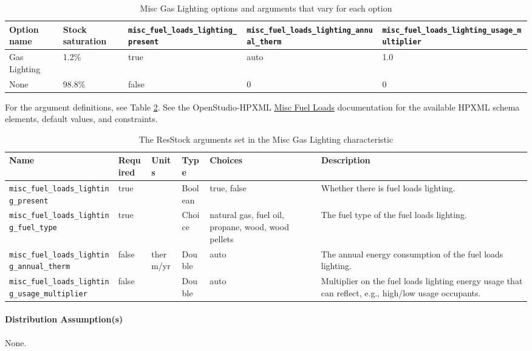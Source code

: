 \begin{longtable}[]{|p{}|p{1.5cm}|p{3.5cm}|p{3.5cm}|p{3.5cm}|} \caption{Misc Gas Lighting options and arguments that vary for each option} \label{table:hc_opt_def_misc_gas_light} \\

\toprule\noalign{}
Option name & Stock saturation &
\texttt{misc\_fuel\_loads\_lighting\_present} &
\texttt{misc\_fuel\_loads\_lighting\_annual\_therm} &
\texttt{misc\_fuel\_loads\_lighting\_usage\_multiplier} \\
\midrule\noalign{}
\endhead
\bottomrule\noalign{}
\endlastfoot
Gas Lighting & 1.2\% & true &  auto & 1.0 \\
None & 98.8\% & false &  0 & 0 \\
\end{longtable}

For the argument definitions, see Table \ref{table:hc_arg_def_misc_gas_light}. See the OpenStudio-HPXML \href{https://openstudio-hpxml.readthedocs.io/en/v1.8.1/workflow_inputs.html#hpxml-fuel-loads}{Misc Fuel Loads} documentation for the available HPXML schema elements, default values, and constraints.

\begin{longtable}[]{|p{3.5cm}|p{1.5cm}|p{1.3cm}|p{1.1cm}|p{}|p{3.3cm}|} \caption{The ResStock arguments set in the Misc Gas Lighting characteristic} \label{table:hc_arg_def_misc_gas_light}  \\
\toprule\noalign{}
Name & Required & Units & Type & Choices & Description \\
\midrule\noalign{}
\endhead
\bottomrule\noalign{}
\endlastfoot
\texttt{misc\_fuel\_loads\_lighting\_present} & true & & Boolean & true,
false & Whether there is fuel loads lighting. \\
\hline
\texttt{misc\_fuel\_loads\_lighting\_fuel\_type} & true & & Choice &
natural gas, fuel oil, propane, wood, wood pellets & The fuel type of
the fuel loads lighting. \\
\hline
\texttt{misc\_fuel\_loads\_lighting\_annual\_therm} & false & therm/yr &
Double & auto & The annual energy consumption of the fuel loads
lighting.  \\
\hline
\texttt{misc\_fuel\_loads\_lighting\_usage\_multiplier} & false & &
Double & auto & Multiplier on the fuel loads lighting energy usage that
can reflect, e.g., high/low usage occupants.  \\
\end{longtable}
\paragraph{Distribution Assumption(s)}
None. 

